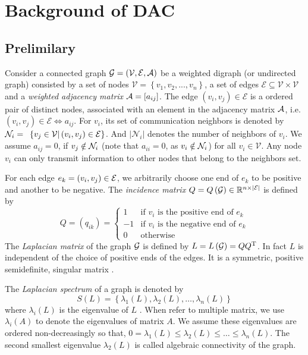 
\chapter{\label{sec:Consensus-problem-on}Background of DAC}


\section{Prelimilary}

Consider a connected graph $\mathcal{G}=\left(\mathcal{V},\mathcal{E},{\cal A}\right)$
be a weighted digraph (or undirected graph) consisted by a set of
nodes $\mathcal{V}=\left\{ v_{1},v_{2},...,v_{n}\right\} $, a set
of edges $\mathcal{E}\subseteq\mathcal{V}\times\mathcal{V}$ and a
\textit{weighted adjacency matrix} ${\cal A}=\left[a_{ij}\right]$.
The edge $\left(v_{i},v_{j}\right)\in\mathfrak{\mathcal{E}}$ is a
ordered pair of distinct nodes, associated with an element in the
adjacency matrix ${\cal A}$, i.e. $\left(v_{i},v_{j}\right)\in\mathfrak{\mathcal{E}}\Leftrightarrow a_{ij}$.
For $v_{i}$, its set of communication neighbors is denoted by $\mathcal{N}_{i}=\text{ }\left\{ v_{j}\in{\cal V}|\left(v_{i},v_{j}\right)\in\mathcal{E}\right\} $.
And $\left|\mathcal{N}_{i}\right|$ denotes the number of neighbors
of $v_{i}$. We assume $a_{ij}=0$, if $v_{j}\notin{\cal N}_{i}$
(note that $a_{ii}=0$, as $v_{i}\notin{\cal N}_{i}$) for all $v_{i}\in\mathcal{V}$.
Any node $v_{i}$ can only transmit information to other nodes that
belong to the neighbors set. 

For each edge $e_{k}=\left(v_{i},v_{j}\right)\in{\cal E}$, we arbitrarily
choose one end of $e_{k}$ to be positive and another to be negative.
The\textit{ incidence matrix} $Q=Q\left({\cal G}\right)\in\mathbb{R}^{n\times\left|{\cal E}\right|}$
is defined by 
\[
Q=\left(q_{ik}\right)=\begin{cases}
1 & \mbox{if }v_{i}\mbox{ is the positive end of }e_{k}\\
-1 & \mbox{if }v_{i}\mbox{ is the negative end of }e_{k}\\
0 & \mbox{otherwise}
\end{cases}
\]
The \textit{Laplacian matrix} of the graph ${\cal G}$ is defined
by $L=L\left({\cal G}\right)=QQ^{\mathrm{T}}$. In fact $L$ is independent
of the choice of positive ends of the edges. It is a symmetric, positive
semidefinite, singular matrix \cite{Russell1994}.

The \textit{Laplacian spectrum} of a graph \cite{Das2004} is denoted
by 
\[
S\left(L\right)=\left\{ \lambda_{1}\left(L\right),\lambda_{2}\left(L\right),\ldots,\lambda_{n}\left(L\right)\right\} 
\]
where $\lambda_{i}\left(L\right)$ is the eigenvalue of $L$ . When
refer to multiple matrix, we use $\lambda_{i}\left(A\right)$ to denote
the eigenvalues of matrix $A$. We assume these eigenvalues are ordered
non-decreasingly so that, $0=\lambda_{1}\left(L\right)\leq\lambda_{2}\left(L\right)\leq\ldots\leq\lambda_{n}\left(L\right)$.
The second smallest eigenvalue $\lambda_{2}\left(L\right)$ is called
algebraic connectivity of the graph. 


